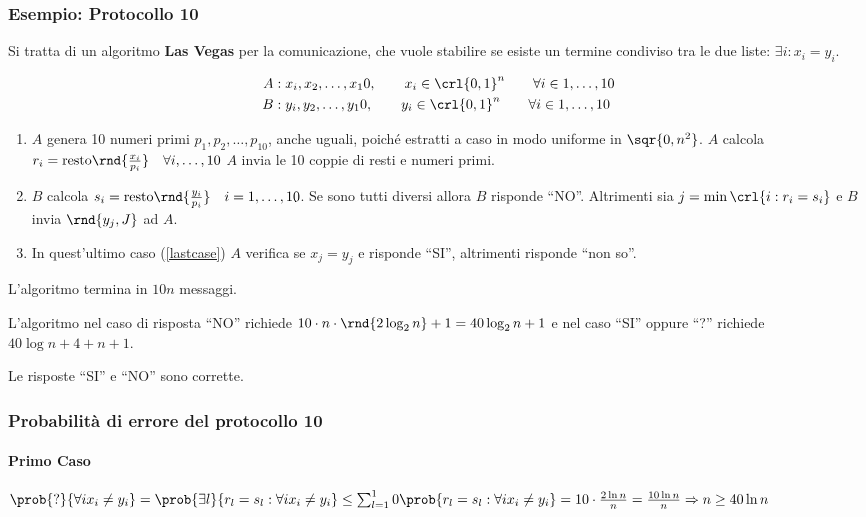 \documentclass[\main/main.tex]{subfiles}
\begin{document}
\subsubsection{Esempio: Protocollo 10}
Si tratta di un algoritmo \textbf{Las Vegas} per la comunicazione, che vuole stabilire se esiste un termine condiviso tra le due liste: \(\exists i: x_i = y_i\).

\begin{align*}
	A & : x_i, x_2, \ldots, x_10, \qquad x_i \in \crl{0,1}^n \qquad \forall i \in 1, \ldots, 10 \\
	B & : y_i, y_2, \ldots, y_10, \qquad y_i \in \crl{0,1}^n \qquad \forall i \in 1, \ldots, 10
\end{align*}

\begin{enumerate}
	\item \(A\) genera 10 numeri primi \(p_1, p_2, \ldots, p_10\), anche uguali, poiché estratti a caso in modo uniforme in \(\sqr{0, n^2}\).
	      \subitem \(A\) calcola \(r_i = \text{resto}\rnd{\frac{x_i}{p_i}} \quad \forall i, \ldots, 10\)
	      \subitem \(A\) invia le 10 coppie di resti e numeri primi.
	\item \(B\) calcola \(s_i = \text{resto}\rnd{\frac{y_i}{p_i}} \quad i = 1, \ldots, 10\).
	      \subitem Se sono tutti diversi allora \(B\) risponde ``NO''.
	      \subitem Altrimenti sia \(j=\min\crl{i: r_i = s_i}\) e \(B\) invia \(\rnd{y_j, J}\) ad \(A\). \label{lastcase}
	\item In quest'ultimo caso (\ref{lastcase}) \(A\) verifica se \(x_j = y_j\) e risponde ``SI'', altrimenti risponde ``non so''.
\end{enumerate}

L'algoritmo termina in \(10n\) messaggi.

L'algoritmo nel caso di risposta ``NO'' richiede \(10\cdot n \cdot \rnd{2 \log_2 n} + 1 = 40\log_2 n +1\) e nel caso ``SI'' oppure ``?'' richiede \(40 \log n + 4 + n +1\).

Le risposte ``SI'' e ``NO'' sono corrette.

\subsubsection{Probabilità di errore del protocollo 10}
\paragraph{Primo Caso} \(\prob{?}{\forall i x_i \neq y_i} = \prob{\exists l}{ r_l = s_l: \forall i x_i \neq y_i} \leq \sum_{l=1}^10 \prob{ r_l = s_l: \forall i x_i \neq y_i} = 10\cdot \frac{2\ln n}{n} = \frac{10\ln n}{n} \Rightarrow n \geq 40 \ln n\)
\end{document}
